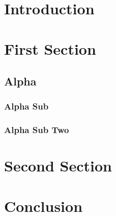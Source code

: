 


	\maketitle
	\thispagestyle{empty}\cleardoublepage  %
	\setcounter{page}{1}  %
	
	\section{Introduction}
	\lipsum[1]  
	
	\section{First Section}
	\lipsum[1]
	
	\subsection{Alpha}
	\lipsum[1]
	
	\subsubsection{Alpha Sub}
	\lipsum[1]
	
	\subsubsection{Alpha Sub Two}
	\lipsum[1]
	
	\section{Second Section}
	\lipsum[1]
	
	\section{Conclusion}
	\lipsum[1]
	
	
	
